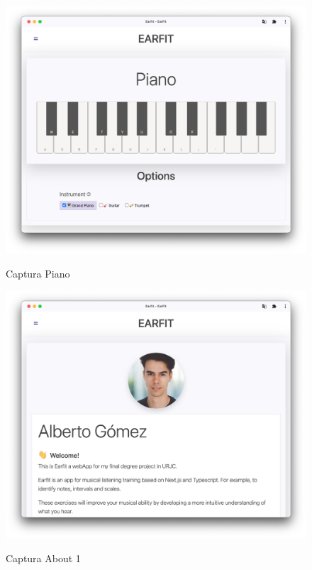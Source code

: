 \documentclass[12pt,twoside,titlepage]{report}
\begin{document}
{\begin{figure}[H]
    \centering
    \includegraphics[scale=0.3]{Capturas Earfit/Tablet/Piano}
    \label{fig:TabletPiano}
    \caption{Captura Piano}
\end{figure}

\begin{figure}[H]
    \centering
    \includegraphics[scale=0.3]{Capturas Earfit/Tablet/About1}
    \label{fig:TabletAbout1}
    \caption{Captura About 1}
\end{figure}

}
\end{document}
